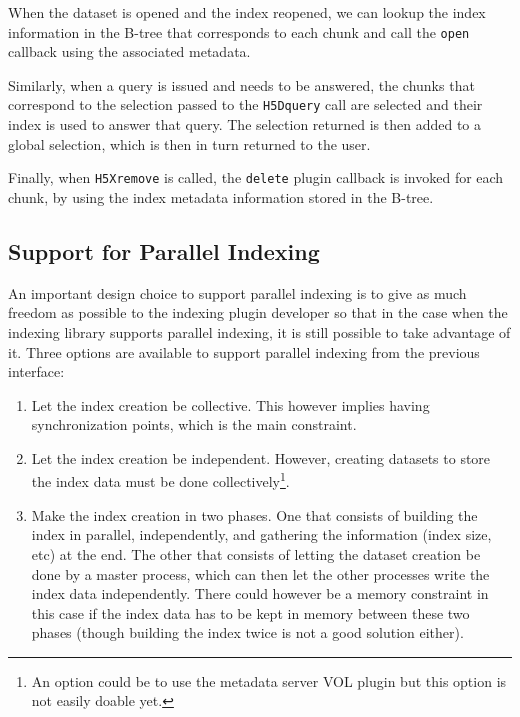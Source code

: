 \documentclass[letterpaper,hyper]{THG_RFC}
\begin{document}
When the dataset is opened and the index reopened, we can lookup the index
information in the B-tree that corresponds to each chunk and call the \texttt{open}
callback using the associated metadata.


Similarly, when a query is issued and needs to be answered, the chunks that
correspond to the selection passed to the \texttt{H5Dquery} call are selected
and their index is used to answer that query. The selection returned is then
added to a global selection, which is then in turn returned to the user.

Finally, when \texttt{H5Xremove} is called, the \texttt{delete} plugin callback is
invoked for each chunk, by using the index metadata information stored in the B-tree.

\subsection{Support for Parallel Indexing}

An important design choice to support parallel indexing is to give as much
freedom as possible to the indexing plugin developer so that in the case when
the indexing library supports parallel indexing, it is still possible to take
advantage of it. Three options are available to support parallel indexing
from the previous interface:
\begin{enumerate}
\item Let the index creation be collective. This however implies having synchronization
points, which is the main constraint.
\item Let the index creation be independent. However, creating datasets to
store the index data must be done collectively\footnote{An option could be to use
the metadata server VOL plugin but this option is not easily doable yet.}.
\item Make the index creation in two phases. One that consists of
building the index in parallel, independently, and gathering the information (index size, etc)
at the end. The other that consists of letting the dataset creation be done by a master
process, which can then let the other processes write the index data independently.
There could however be a memory constraint in this case if the index data has to
be kept in memory between these two phases (though building the index twice is not
a good solution either).
\end{enumerate}
\end{document}
